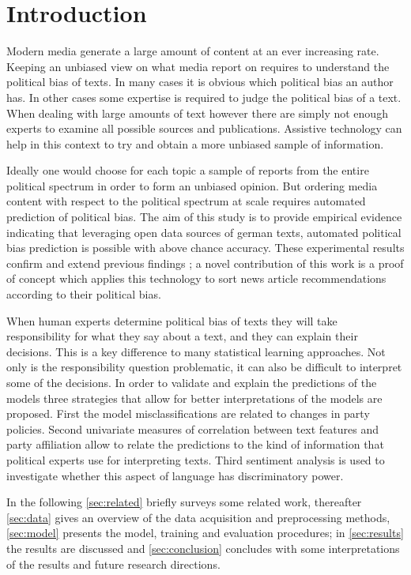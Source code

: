 \documentclass[runningheads,a4paper]{llncs}
\begin{document}
\section{Introduction}
\label{sec:intro}
%
Modern media generate a large amount of content at an ever increasing rate. Keeping an unbiased view on what media report on requires to understand the political bias of texts. In many cases it is obvious which political bias an author has. In other cases some expertise is required to judge the political bias of a text. 
%
When dealing with large amounts of text however there are simply not enough experts to examine all possible sources and publications. Assistive technology can help in this context to try and obtain a more unbiased sample of information. 

Ideally one would choose for each topic a sample of reports from the entire political spectrum in order to form an unbiased opinion. But ordering media content with respect to the political spectrum at scale requires automated prediction of political bias. The aim of this study is to provide empirical evidence  indicating that leveraging open data sources of german texts, automated political bias prediction is possible with above chance accuracy. These experimental results  confirm and extend previous findings \cite{Yu2008, Hirst2014}; a novel contribution of this work is a proof of concept which applies this technology to sort news article recommendations according to their political bias. 

When human experts determine political bias of texts they will take responsibility for what they say about a text, and they can explain their decisions. This is a key difference to many statistical learning approaches. Not only is the responsibility question problematic, it can also be difficult to interpret some of the decisions. In order to validate and explain the predictions of the models three strategies that allow for better interpretations of the models are proposed. First the model misclassifications are related to changes in party policies. Second univariate measures of correlation between text features and party affiliation allow to relate the predictions to the kind of information that political experts use for interpreting texts. Third sentiment analysis is used to investigate whether this aspect of language has discriminatory power. 

In the following \autoref{sec:related} briefly surveys some related work, thereafter \autoref{sec:data} gives an overview of the data acquisition and preprocessing methods, \autoref{sec:model} presents the model, training and evaluation procedures; in \autoref{sec:results} the results are discussed and \autoref{sec:conclusion} concludes with some interpretations of the results and future research directions. 
\end{document}
